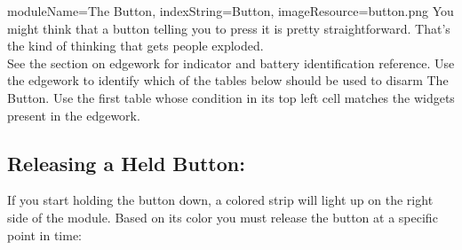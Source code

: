 \begin{module}{
  moduleName=The Button,
  indexString=Button,
  imageResource=button.png
}
{
  You might think that a button telling you to press it is pretty straightforward.
  That’s the kind of thinking that gets people exploded.\medskip\\
  See the section on edgework for indicator and battery identification reference.
}
  Use the edgework to identify which of the tables below should be used to disarm The Button.
  Use the first table whose condition in its top left cell matches the widgets present in the edgework.

  \subsection*{Releasing a Held Button:}
  If you start holding the button down, a colored strip will light up on the right side of the module.
  Based on its color you must release the button at a specific point in time:
\end{module}
